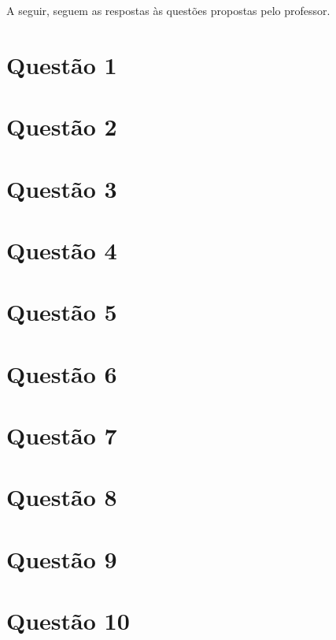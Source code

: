 
A seguir, seguem as respostas às questões propostas pelo professor.

\section{Questão 1}
\label{chap:q1}
	

\section{Questão 2}
\label{chap:q2}
	
	
\section{Questão 3}
\label{chap:q3}
	

\section{Questão 4}
\label{chap:q4}
	

\section{Questão 5}
\label{chap:q5}
	

\section{Questão 6}
\label{chap:q6}
	

\section{Questão 7}
\label{chap:q7}
	

\section{Questão 8}
\label{chap:q8}
	

\section{Questão 9}
\label{chap:q9}
	

\section{Questão 10}
\label{chap:q10}
	
